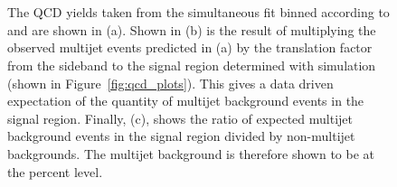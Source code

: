 \begin{figure}[!h]
  \centering
   ~
   \\
   \\
  \caption{
    The QCD yields taken from the simultaneous fit binned according to \njet and \scalht are shown in (a).
    Shown in (b) is the result of multiplying the observed multijet events predicted
    in (a) by the translation factor from the sideband to the signal
    region determined with simulation (shown in
    Figure~\ref{fig:qcd_plots}). This gives a data driven expectation of
    the quantity of multijet background events in the signal region. 
    Finally, (c), shows the ratio of expected
    multijet background events in the signal region divided by
    non-multijet backgrounds. The multijet background is therefore
    shown to be at the percent level.}
  \label{fig:qcd_plots2}
\end{figure}

